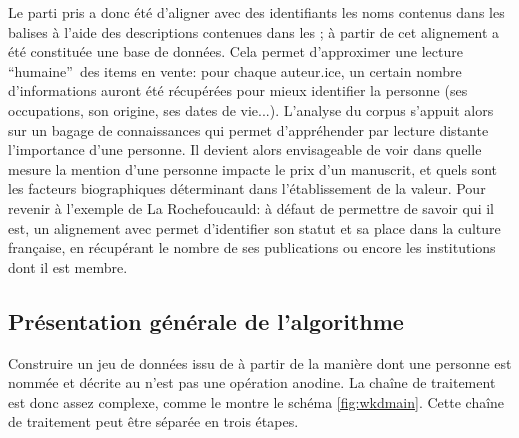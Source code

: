 Le parti pris a donc été d'aligner avec des identifiants \wkd{} les noms contenus dans les balises \tname{} à l'aide des descriptions contenues dans les \ttrait{}; à partir de cet alignement a été constituée une base de données. Cela permet d'approximer une lecture \enquote{humaine} des items en vente: pour chaque auteur.ice, un certain nombre d'informations auront été récupérées pour mieux identifier la personne (ses occupations, son origine, ses dates de vie...). L'analyse du corpus s'appuit alors sur un bagage de connaissances qui permet d'appréhender par lecture distante l'importance d'une personne. Il devient alors envisageable de voir dans quelle mesure la mention d'une personne impacte le prix d'un manuscrit, et quels sont les facteurs biographiques déterminant dans l'établissement de la valeur. Pour revenir à l'exemple de La Rochefoucauld: à défaut de permettre de savoir qui il est, un alignement avec \wkd{} permet d'identifier son statut et sa place dans la culture française, en récupérant le nombre de ses publications ou encore les institutions dont il est membre.


\subsection{Présentation générale de l'algorithme}
Construire un jeu de données issu de \sparql{} à partir de la manière dont une personne est nommée et décrite au  n'est pas une opération anodine. La chaîne de traitement est donc assez complexe, comme le montre le schéma \ref{fig:wkdmain}. Cette chaîne de traitement peut être séparée en trois étapes.

